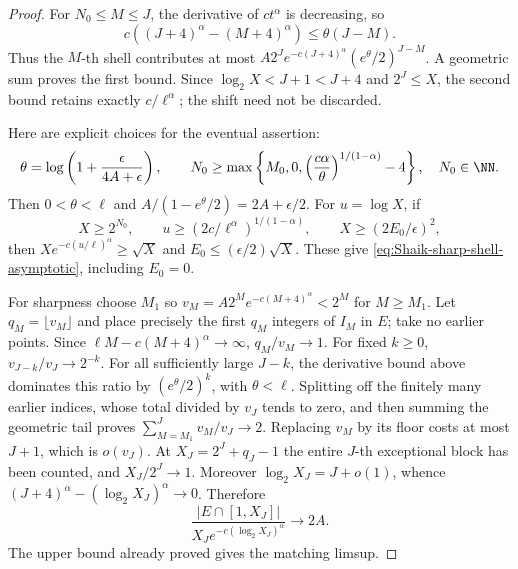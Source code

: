 \begin{proof}
For \(N_0\le M\le J\), the derivative of \(ct^\alpha\) is decreasing,
so
\[
 c((J+4)^\alpha-(M+4)^\alpha)\le\theta(J-M).
\]
Thus the \(M\)-th shell contributes at most
\(A2^Je^{-c(J+4)^\alpha}(e^\theta/2)^{J-M}\).
A geometric sum proves the first bound. Since
\(\log_2X<J+1<J+4\) and \(2^J\le X\), the second bound retains
exactly \(c/\ell^\alpha\); the shift need not be discarded.

Here are explicit choices for the eventual assertion:
\[
 \theta=\log\left(1+\frac{\epsilon}{4A+\epsilon}\right),\qquad
 N_0\ge\max\left\{M_0,0,
       \left(\frac{c\alpha}{\theta}\right)^{1/(1-\alpha)}-4\right\},
 \quad N_0\in\NN .
\]
Then \(0<\theta<\ell\) and
\(A/(1-e^\theta/2)=2A+\epsilon/2\).
For \(u=\log X\), if
\[
 X\ge2^{N_0},\qquad
 u\ge(2c/\ell^\alpha)^{1/(1-\alpha)},\qquad
 X\ge(2E_0/\epsilon)^2,
\]
then \(X e^{-c(u/\ell)^\alpha}\ge\sqrt X\) and
\(E_0\le(\epsilon/2)\sqrt X\).
These give \eqref{eq:Shaik-sharp-shell-asymptotic}, including \(E_0=0\).

For sharpness choose \(M_1\) so
\(v_M=A2^M e^{-c(M+4)^\alpha}<2^M\) for \(M\ge M_1\).
Let \(q_M=\lfloor v_M\rfloor\) and place precisely the first \(q_M\)
integers of \(I_M\) in \(E\); take no earlier points.
Since \(\ell M-c(M+4)^\alpha\to\infty\), \(q_M/v_M\to1\).
For fixed \(k\ge0\), \(v_{J-k}/v_J\to2^{-k}\).
For all sufficiently large \(J-k\), the derivative bound above
dominates this ratio by \((e^\theta/2)^k\), with \(\theta<\ell\).
Splitting off the finitely many earlier indices, whose total divided
by \(v_J\) tends to zero, and then summing the geometric tail proves
\(\sum_{M=M_1}^Jv_M/v_J\to2\).
Replacing \(v_M\) by its floor costs at most \(J+1\), which is
\(o(v_J)\). At \(X_J=2^J+q_J-1\) the entire \(J\)-th exceptional
block has been counted, and \(X_J/2^J\to1\).
Moreover \(\log_2X_J=J+o(1)\), whence
\((J+4)^\alpha-(\log_2X_J)^\alpha\to0\).
Therefore
\[
 \frac{|E\cap[1,X_J]|}
 {X_Je^{-c(\log_2X_J)^\alpha}}\longrightarrow2A .
\]
The upper bound already proved gives the matching limsup.
\end{proof}

